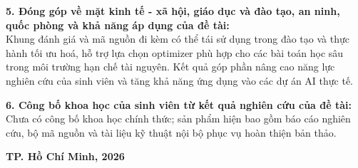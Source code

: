 \documentclass[a4paper,12pt]{article}
\newcommand{\ReportDate}{TP. Hồ Chí Minh, 2026}
\begin{document}
\begin{titlepage}
\vspace{0.45cm}
\noindent\textbf{5. Đóng góp về mặt kinh tế - xã hội, giáo dục và đào tạo, an ninh, quốc phòng và khả năng áp dụng của đề tài:}\\
Khung đánh giá và mã nguồn đi kèm có thể tái sử dụng trong đào tạo và thực hành tối ưu hoá, hỗ trợ lựa chọn optimizer phù hợp cho các bài toán học sâu trong môi trường hạn chế tài nguyên. Kết quả góp phần nâng cao năng lực nghiên cứu của sinh viên và tăng khả năng ứng dụng vào các dự án AI thực tế.

\vspace{0.45cm}
\noindent\textbf{6. Công bố khoa học của sinh viên từ kết quả nghiên cứu của đề tài:}\\
Chưa có công bố khoa học chính thức; sản phẩm hiện bao gồm báo cáo nghiên cứu, bộ mã nguồn và tài liệu kỹ thuật nội bộ phục vụ hoàn thiện bản thảo.

\vfill
\begin{center}
{\large \textbf{\ReportDate}}
\end{center}
\end{titlepage}
\end{document}
